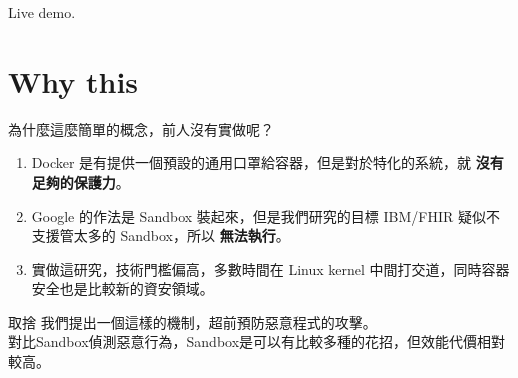 \documentclass{beamer}
\begin{document}
\begin{CJK*}{UTF8}{bsmi}
    \begin{frame}
        \centering
        \Huge Live demo.
    \end{frame}

    \section{Why this}
    \begin{frame}{為什麼這麼簡單的概念，前人沒有實做呢？}
        \begin{enumerate}
            \item Docker 是有提供一個預設的通用口罩給容器，但是對於特化的系統，就{\color{blue} \textbf{沒有足夠的保護力}}。
            \item Google 的作法是 Sandbox 裝起來，但是我們研究的目標 IBM/FHIR 疑似不支援管太多的 Sandbox，所以{\color{red} \textbf{無法執行}}。
            \item 實做這研究，技術門檻偏高，多數時間在 Linux kernel 中間打交道，同時容器安全也是比較新的資安領域。
        \end{enumerate}
    \end{frame}

    \begin{frame}{取捨}
        我們提出一個這樣的機制，超前預防惡意程式的攻擊。\\
        對比Sandbox偵測惡意行為，Sandbox是可以有比較多種的花招，但效能代價相對較高。
    \end{frame}


\end{CJK*}
\end{document}
